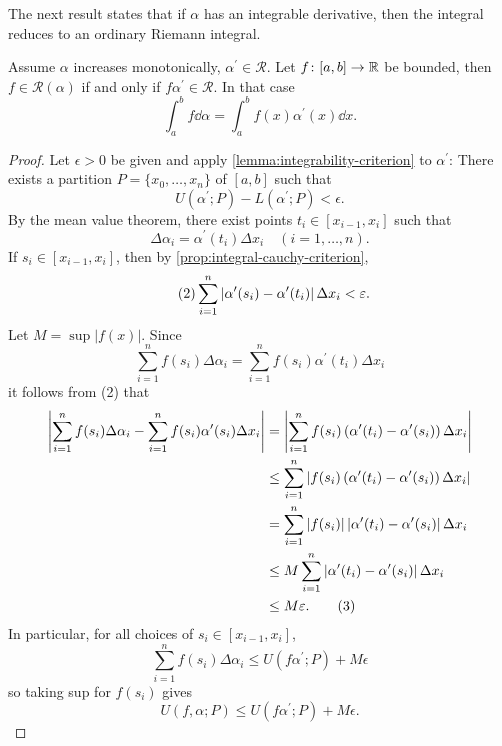 The next result states that if $\alpha$ has an integrable derivative, then the integral reduces to an ordinary Riemann integral.

\begin{proposition}\label{prop:reduce-to-riemann-integral}
Assume $\alpha$ increases monotonically, $\alpha^\prime\in\mathcal{R}$. Let $f\colon[a,b]\to\mathbb R$ be bounded, then $f\in \mathcal{R}(\alpha)$ if and only if $f\alpha^\prime\in\mathcal{R}$. In that case
\begin{equation}
\int_{a}^{b}f\dd{\alpha}=\int_{a}^{b}f(x)\alpha^\prime(x)\dd{x}.
\end{equation}
\end{proposition}

\begin{proof}
Let $\epsilon>0$ be given and apply \ref{lemma:integrability-criterion} to $\alpha^\prime$: There exists a partition $P=\{x_0,\dots,x_n\}$ of $[a,b]$ such that
\begin{equation*}\tag{1}
U(\alpha^\prime;P)-L(\alpha^\prime;P)<\epsilon.
\end{equation*}
By the mean value theorem, there exist points $t_i\in[x_{i-1},x_i]$ such that
\[\Delta\alpha_i=\alpha^\prime(t_i)\Delta x_i\quad(i=1,\dots,n).\]
If $s_i\in[x_{i-1},x_i]$, then by \ref{prop:integral-cauchy-criterion},
\begin{equation*}\tag{2}
\sum_{i=1}^{n}\left|\alpha^\prime(s_i)-\alpha^\prime(t_i)\right|\Delta x_i<\varepsilon.
\end{equation*}
Let $M=\sup|f(x)|$. Since
\[\sum_{i=1}^{n}f(s_i)\Delta\alpha_i=\sum_{i=1}^{n}f(s_i)\alpha^\prime(t_i)\Delta x_i\]
it follows from (2) that
\begin{align*}
\left|\sum_{i=1}^{n}f(s_i)\Delta\alpha_i-\sum_{i=1}^{n}f(s_i)\alpha^\prime(s_i)\Delta x_i\right|
&=\left|\sum_{i=1}^{n}f(s_i)\left(\alpha^\prime(t_i)-\alpha^\prime(s_i)\right)\Delta x_i\right|\\
&\le\sum_{i=1}^{n}\left|f(s_i)\left(\alpha^\prime(t_i)-\alpha^\prime(s_i)\right)\Delta x_i\right|\\
&=\sum_{i=1}^{n}|f(s_i)|\left|\alpha^\prime(t_i)-\alpha^\prime(s_i)\right|\Delta x_i\\
&\le M\sum_{i=1}^{n}\left|\alpha^\prime(t_i)-\alpha^\prime(s_i)\right|\Delta x_i\\
&\le M\varepsilon.\tag{3}
\end{align*}
In particular, for all choices of $s_i\in[x_{i-1},x_i]$,
\[\sum_{i=1}^{n}f(s_i)\Delta\alpha_i\le U(f\alpha^\prime;P)+M\epsilon\]
so taking sup for $f(s_i)$ gives
\[U(f,\alpha;P)\le U(f\alpha^\prime;P)+M\epsilon.\]

\end{proof}
